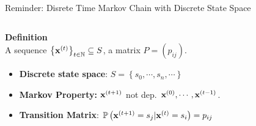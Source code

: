 \documentclass[aspectratio=169, 9pt]{beamer}
\theoremstyle{definition}
\begin{document}
\begin{frame}{Reminder: Disrete Time Markov Chain with Discrete State Space}
  \begin{columns}
  \begin{column}{0.6\textwidth}
    \textbf{Definition}\\
    A sequence $\left\{ \mathbf{x}^{(t)}\right\}_{t\in\mathbb{N}}
    \subseteq S$, a matrix $P=\left( p_{ij} \right)$.
    \vspace{1cm}
    \begin{itemize}
      \item \textbf{Discrete state space}: \(
        S=\left\{ s_0,\cdots,s_n,\cdots \right\}
      \) 
      \vspace{1cm}
    \item \textbf{Markov Property:} $\mathbf{x}^{(t+1)}$ not dep. $\mathbf{x}^{(0)},\cdots,\mathbf{x}^{(t-1)}$.
      \vspace{1cm}

    \item \textbf{Transition Matrix}: \(
        \mathbb{P}\left( \mathbf{x}^{(t+1)}=s_j \vert \mathbf{x}^{(t)}=s_i\right)=p_{ij}
      \)
    \end{itemize}
  \end{column}
    \begin{column}{0.4\textwidth}
  \end{column}%
  \end{columns}
\end{frame}
\end{document}
